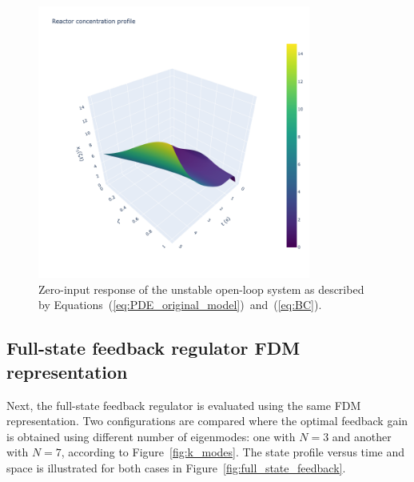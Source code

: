 \begin{figure}[!htbp]
    \centering
    \includegraphics[width=0.8\textwidth,trim=0 0 100 0,clip]{Figures/3D_x1_openloop.png}
    \caption{Zero-input response of the unstable open-loop system as described by Equations~(\ref{eq:PDE_original_model})~and~(\ref{eq:BC}).}
    \label{fig:3D_x1_openloop}
\end{figure}

\subsection{Full-state feedback regulator FDM representation}


Next, the full-state feedback regulator is evaluated using the same FDM representation. Two configurations are compared where the optimal feedback gain is obtained using different number of eigenmodes: one with $N=3$ and another with $N=7$, according to Figure~\ref{fig:k_modes}. The state profile versus time and space is illustrated for both cases in Figure~\ref{fig:full_state_feedback}. 

